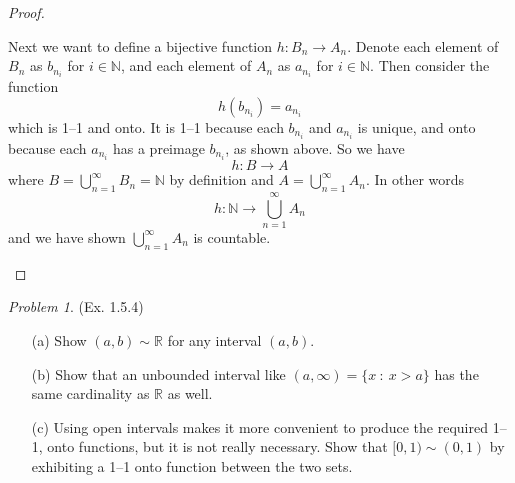 \documentclass[11pt,twoside, reqno]{amsart}
\theoremstyle{remark}
\newtheorem{Prob}{Problem}
\def\R{\mathbb R}
\def\N{\mathbb N}
\begin{document}
\begin{proof}
\begin{enumerate}
    Next we want to define a bijective function $h:B_n \to A_n$. Denote each element of $B_n$ as $b_{n_i}$ for $i \in \N$, and each element of $A_n$ as $a_{n_i}$ for $i \in \N$. Then consider the function
    $$
    h(b_{n_i}) = a_{n_i}
    $$
    which is 1--1 and onto. It is 1--1 because each $b_{n_i}$ and $a_{n_i}$ is unique, and onto because each $a_{n_i}$ has a preimage $b_{n_i}$, as shown above. So we have
    $$
    h:B \to A
    $$
    where $B = \bigcup^\infty_{n=1} B_n = \N$ by definition and $A = \bigcup^\infty_{n=1} A_n$. In other words
    $$
    h: \N \to \bigcup^\infty_{n=1} A_n
    $$
    and we have shown $\bigcup^\infty_{n=1} A_n$ is countable.
\end{enumerate}
\end{proof}


\begin{Prob}(Ex. 1.5.4) 
\begin{enumerate}
\item[(a)] Show $(a, b) \sim \R$ for any interval $(a, b)$.
\item[(b)] Show that an unbounded interval like $(a, \infty) = \{x~ :~ x > a\}$ has the same cardinality as $\R$ as well.
\item[(c)] Using open intervals makes it more convenient to produce the required 1--1, onto functions, but it is not really necessary. Show that $[0, 1)\sim (0, 1)$ by exhibiting a 1--1 onto function between the two sets.
\end{enumerate}
\end{Prob}
\end{document}
